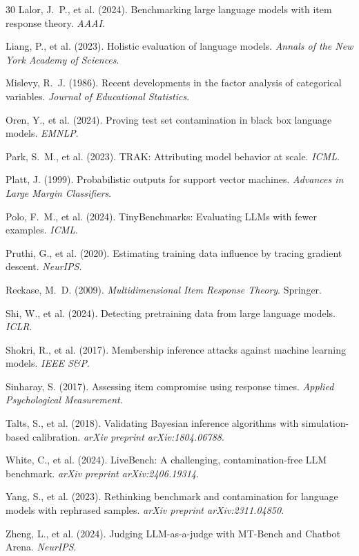 \documentclass[11pt,a4paper]{article}
\begin{document}
\begin{thebibliography}{30}
Lalor, J.~P., et al. (2024).
Benchmarking large language models with item response theory.
{\em AAAI}.

Liang, P., et al. (2023).
Holistic evaluation of language models.
{\em Annals of the New York Academy of Sciences}.

Mislevy, R.~J. (1986).
Recent developments in the factor analysis of categorical variables.
{\em Journal of Educational Statistics}.

Oren, Y., et al. (2024).
Proving test set contamination in black box language models.
{\em EMNLP}.

Park, S.~M., et al. (2023).
TRAK: Attributing model behavior at scale.
{\em ICML}.

Platt, J. (1999).
Probabilistic outputs for support vector machines.
{\em Advances in Large Margin Classifiers}.

Polo, F.~M., et al. (2024).
TinyBenchmarks: Evaluating LLMs with fewer examples.
{\em ICML}.

Pruthi, G., et al. (2020).
Estimating training data influence by tracing gradient descent.
{\em NeurIPS}.

Reckase, M.~D. (2009).
{\em Multidimensional Item Response Theory}.
Springer.

Shi, W., et al. (2024).
Detecting pretraining data from large language models.
{\em ICLR}.

Shokri, R., et al. (2017).
Membership inference attacks against machine learning models.
{\em IEEE S\&P}.

Sinharay, S. (2017).
Assessing item compromise using response times.
{\em Applied Psychological Measurement}.

Talts, S., et al. (2018).
Validating Bayesian inference algorithms with simulation-based calibration.
{\em arXiv preprint arXiv:1804.06788}.

White, C., et al. (2024).
LiveBench: A challenging, contamination-free LLM benchmark.
{\em arXiv preprint arXiv:2406.19314}.

Yang, S., et al. (2023).
Rethinking benchmark and contamination for language models with rephrased samples.
{\em arXiv preprint arXiv:2311.04850}.

Zheng, L., et al. (2024).
Judging LLM-as-a-judge with MT-Bench and Chatbot Arena.
{\em NeurIPS}.

\end{thebibliography}
\end{document}
